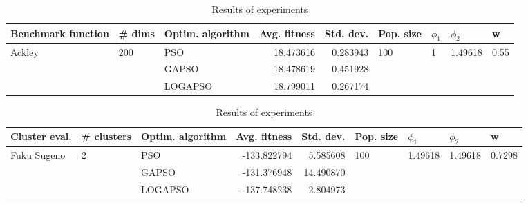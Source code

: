\documentclass{article}
\begin{document}
\begin{table}
\centering
\caption{Results of experiments}
\begin{tabular}{lllrrllll}
\toprule
     Benchmark function &              \# dims & Optim. algorithm &  Avg. fitness &  Std. dev. &            Pop. size &         $\phi_{1}$ &               $\phi_{2}$ &                     w \\
\midrule
\multirow{3}{*}{Ackley} & \multirow{3}{*}{200} &              PSO &     18.473616 &   0.283943 & \multirow{3}{*}{100} & \multirow{3}{*}{1} & \multirow{3}{*}{1.49618} & \multirow{3}{*}{0.55} \\
                        &                      &            GAPSO &     18.478619 &   0.451928 &                      &                    &                          &                       \\
                        &                      &          LOGAPSO &     18.799011 &   0.267174 &                      &                    &                          &                       \\
\bottomrule
\end{tabular}
\end{table}
\begin{table}
\centering
\caption{Results of experiments}
\begin{tabular}{lllrrllll}
\toprule
               Cluster eval. &        \# clusters & Optim. algorithm &  Avg. fitness &  Std. dev. &            Pop. size &               $\phi_{1}$ &               $\phi_{2}$ &                       w \\
\midrule
\multirow{3}{*}{Fuku Sugeno} & \multirow{3}{*}{2} &              PSO &   -133.822794 &   5.585608 & \multirow{3}{*}{100} & \multirow{3}{*}{1.49618} & \multirow{3}{*}{1.49618} & \multirow{3}{*}{0.7298} \\
                             &                    &            GAPSO &   -131.376948 &  14.490870 &                      &                          &                          &                         \\
                             &                    &          LOGAPSO &   -137.748238 &   2.804973 &                      &                          &                          &                         \\
\bottomrule
\end{tabular}
\end{table}
\end{document}
